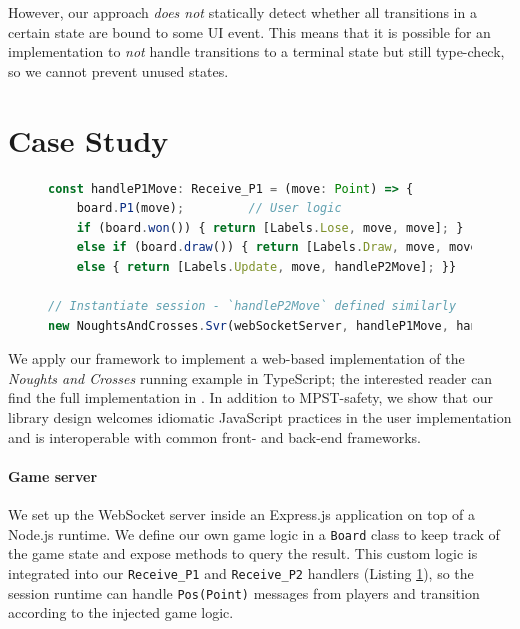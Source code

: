 \documentclass[submission,copyright,creativecommons]{eptcs}
\begin{document}
However, our approach \textit{does not} statically detect whether all transitions in a certain state are bound to some UI event. This means that it is possible for an implementation to \textit{not} handle transitions to a terminal state but still type-check, so we cannot prevent unused states.

\section{Case Study}
\label{section:example}

\begin{figure}
\begin{lstlisting}[language=JavaScript, tabsize=4]
const handleP1Move: Receive_P1 = (move: Point) => {
	board.P1(move);			// User logic
	if (board.won()) { return [Labels.Lose, move, move]; }
	else if (board.draw()) { return [Labels.Draw, move, move]; }
	else { return [Labels.Update, move, handleP2Move]; }}

// Instantiate session - `handleP2Move` defined similarly
new NoughtsAndCrosses.Svr(webSocketServer, handleP1Move, handleP2Move);
\end{lstlisting}  
\label{lst:svrprotocol}
\end{figure}

We apply our framework to implement a web-based implementation of the \textit{Noughts and Crosses} running example in TypeScript; the interested reader can find the full implementation in \cite{NoughtsAndCrosses}. In addition to MPST-safety, we show that our library design welcomes idiomatic JavaScript practices in the user implementation and is interoperable with common front- and back-end frameworks.
 
\paragraph{Game server} We set up the WebSocket server inside an Express.js \cite{ExpressJS} application on top of a Node.js \cite{NodeJS} runtime. We define our own game logic in a \texttt{Board} class to keep track of the game state and expose methods to query the result. This custom logic is integrated into our \texttt{Receive\_P1} and \texttt{Receive\_P2} handlers (Listing \ref{lst:svrprotocol}), so the session runtime can handle \texttt{Pos(Point)} messages from players and transition according to the injected game logic. 
\end{document}
